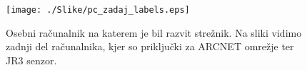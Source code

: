 \begin{figure}
	\centering
	\texttt{[image: ./Slike/pc\_zadaj\_labels.eps]}
	\caption{Osebni ra\v{c}unalnik na katerem je bil razvit stre\v{z}nik. Na sliki vidimo zadnji del ra\v{c}unalnika, kjer so priklju\v{c}ki za ARCNET omre\v{z}je ter JR3 senzor.}
	\label{fig:pc_zadaj_labels}
\end{figure}

